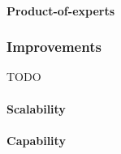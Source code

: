 \paragraph{Product-of-experts}


\subsubsection{Improvements}
TODO

\paragraph{Scalability}

\paragraph{Capability}


% 
% 
% 
% 
% 
% 

